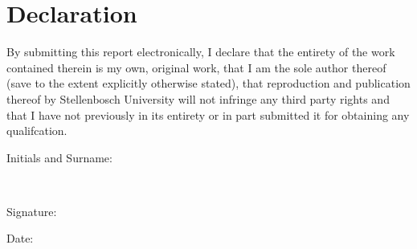 \chapter{Declaration}
\label{declaration}

By submitting this report electronically, I declare that the entirety of the work contained
therein is my own, original work, that I am the sole author thereof (save to the extent
explicitly otherwise stated), that reproduction and publication thereof by Stellenbosch
University will not infringe any third party rights and that I have not previously in its
entirety or in part submitted it for obtaining any qualifcation.
\vspace{3cm}

\noindent%
\parbox{.5\textwidth}{%
  Initials and Surname:\quad\dotfill\par}
\vspace{1cm}\\

\noindent%
\parbox{.5\textwidth}{%
  Signature:\quad\dotfill\par}
\vspace{1.5cm}

\noindent%
\parbox{.5\textwidth}{%
  Date:\quad\dotfill\par}